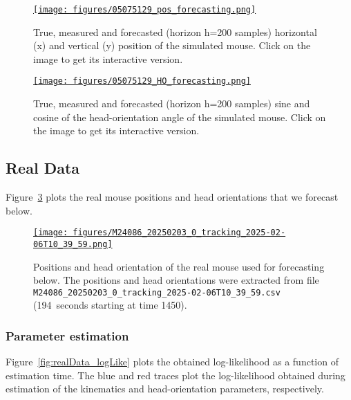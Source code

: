 \documentclass[12pt]{article}
\begin{document}
\begin{figure}
    \centering
    \href{https://www.gatsby.ucl.ac.uk/~rapela/aman/reports/ekfForKinematicsAndHeadOrientation/figures/05075129_pos_forecasting.html}{\texttt{[image: figures/05075129\_pos\_forecasting.png]}}
    \caption{True, measured and forecasted (horizon h=200 samples) horizontal (x) and vertical (y)
    position of the simulated mouse. Click on the image to get its
    interactive version.}
    \label{fig:sim_h200_pos}
\end{figure}

\begin{figure}
    \centering
    \href{https://www.gatsby.ucl.ac.uk/~rapela/aman/reports/ekfForKinematicsAndHeadOrientation/figures/05075129_HO_forecasting.html}{\texttt{[image: figures/05075129\_HO\_forecasting.png]}}
    \caption{True, measured and forecasted (horizon h=200 samples) sine and
    cosine of the head-orientation angle
    of the simulated mouse. Click on the image to get its
    interactive version.}
    \label{fig:sim_h200_HO}
\end{figure}

\subsection{Real Data}
\label{sec:realData}

Figure~\ref{fig:real_posAndHO} plots the real mouse positions and head
orientations that we forecast below.

\begin{figure}
    \centering
    \href{https://www.gatsby.ucl.ac.uk/~rapela/aman/reports/ekfForKinematicsAndHeadOrientation/figures/M24086_20250203_0_tracking_2025-02-06T10_39_59.html}{\texttt{[image: figures/M24086\_20250203\_0\_tracking\_2025-02-06T10\_39\_59.png]}}

    \caption{Positions and head orientation of the real mouse used for
    forecasting below. The positions and head orientations were extracted from
    file \texttt{M24086\_20250203\_0\_tracking\_2025-02-06T10\_39\_59.csv}
    (194~seconds starting at time 1450).}

    \label{fig:real_posAndHO}
\end{figure}

\subsubsection*{Parameter estimation}

Figure~\ref{fig:realData_logLike} plots the obtained
log-likelihood as a function of estimation time. The blue and red traces plot the
log-likelihood obtained during estimation of the kinematics and
head-orientation parameters, respectively.
\end{document}
